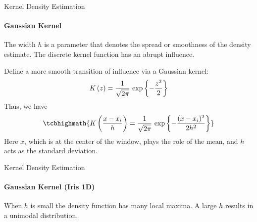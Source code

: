 \begin{frame}{Kernel Density Estimation}
\framesubtitle{Gaussian Kernel}
The width $h$ is a parameter that
denotes the spread or smoothness of the density estimate.
The discrete kernel function has
an abrupt influence. 

\medskip
Def\/{i}ne a more smooth
transition of influence via a Gaussian kernel:
\begin{align*}
  K\left(z\right) =
  \frac{1}{\sqrt{2\pi}}\,\exp\left\{-\frac{z^2}{2}\right\}
\end{align*}
Thus, we have
\begin{align*}
\tcbhighmath{
  K\left(\frac{x-x_i}{h}\right) =
  \frac{1}{\sqrt{2\pi}}\,\exp\lB\{-\frac{(x-x_i)^2}{2h^2}\rB\}
}
\end{align*}
Here $x$, which is at the center of the window, plays the role of
the mean, and $h$ acts as the standard deviation.
\end{frame}


\begin{frame}[fragile]{Kernel Density Estimation}
\framesubtitle{Gaussian Kernel (Iris 1D)}
\setcounter{subfigure}{0}
\vspace*{-0.7cm}
\begin{figure}[!t]%
\centerline{
\hspace{-0.3in}
}
\vspace*{-0.7cm}
\centerline{
\hspace{-0.3in}
}
\end{figure}
\small
  When $h$ is small
the density function has many
  local maxima. A large $h$ results in a unimodal distribution.

\end{frame}


